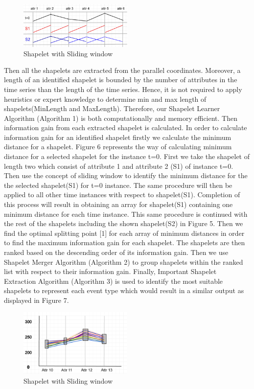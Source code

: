 \documentclass[conference]{IEEEtran}  %
\begin{document}
\begin{figure}[h!]
\includegraphics[width=0.5\textwidth]{movingWindow.png}
\caption{Shapelet with Sliding window}
\end{figure}

Then all the shapelets are extracted from the parallel coordinates. Moreover, a length of an identified shapelet is bounded by the number of attributes in the time series than the length of the time series. Hence, it is not required to apply heuristics or expert knowledge to determine min and max length of shapelets(MinLength and MaxLength). Therefore, our Shapelet Learner Algorithm (Algorithm 1) is both computationally and memory efficient. Then information gain from each extracted shapelet is calculated. In order to calculate information gain for an identified shapelet firstly we calculate the minimum distance for a shapelet. Figure 6 represents the way of calculating minimum distance for a selected shapelet for the instance t=0. First we take the shapelet of length two which consist of attribute 1 and attribute 2 (S1) of instance t=0. Then use the concept of sliding window to identify the minimum distance for the the selected shapelet(S1) for t=0 instance. The same procedure will then be applied to all other time instances with respect to shapelet(S1). Completion of this process will result in obtaining an array for shapelet(S1) containing one minimum distance for each time instance. This same procedure is continued with the rest of the shapelets including the shown shapelet(S2) in Figure 5. Then we find the optimal splitting point [1] for each array of minimum distances in order to find the maximum information gain for each shapelet. The shapelets are then ranked based on the descending order of its information gain. Then we use Shapelet Merger Algorithm (Algorithm 2) to group shapelets within the ranked list with respect to their information gain. Finally, Important Shapelet Extraction Algorithm (Algorithm 3) is used to identify the most suitable shapelets to represent each event type which would result in a similar output as displayed in Figure 7.
\begin{figure}[h!]
\includegraphics[width=0.5\textwidth]{demo.png}
\caption{Shapelet with Sliding window}
\end{figure}
\end{document}
